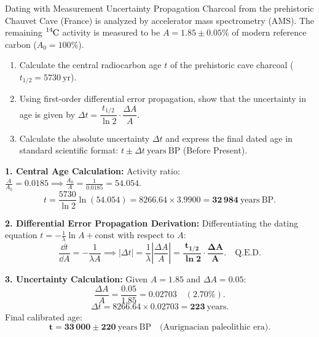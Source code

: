 \begin{exercise}{Dating with Measurement Uncertainty Propagation}
Charcoal from the prehistoric Chauvet Cave (France) is analyzed by accelerator mass spectrometry (AMS). The remaining $\ce{^{14}C}$ activity is measured to be $A = 1.85 \pm 0.05\%$ of modern reference carbon ($A_0 = 100\%$).
\begin{enumerate}[leftmargin=1.5em,itemsep=2pt]
  \item Calculate the central radiocarbon age $t$ of the prehistoric cave charcoal ($t_{1/2} = 5730\ \mathrm{yr}$).
  \item Using first-order differential error propagation, show that the uncertainty in age is given by $\Delta t = \dfrac{t_{1/2}}{\ln 2} \cdot \dfrac{\Delta A}{A}$.
  \item Calculate the absolute uncertainty $\Delta t$ and express the final dated age in standard scientific format: $t \pm \Delta t\ \mathrm{years\ BP}$ (Before Present).
\end{enumerate}
\end{exercise}

\begin{tabletworkspace}[5.0cm]
\end{tabletworkspace}

\begin{solution}
\textbf{1. Central Age Calculation:}
Activity ratio: $\frac{A}{A_0} = 0.0185 \implies \frac{A_0}{A} = \frac{1}{0.0185} = 54.054$.
\[
t = \frac{5730}{\ln 2} \ln(54.054) = 8266.64 \times 3.9900 = \mathbf{32\,984\ \mathrm{years\ BP}}.
\]

\textbf{2. Differential Error Propagation Derivation:}
Differentiating the dating equation $t = -\frac{1}{\lambda} \ln A + \text{const}$ with respect to $A$:
\[
\frac{\dd t}{\dd A} = -\frac{1}{\lambda A} \implies |\Delta t| = \frac{1}{\lambda} \left| \frac{\Delta A}{A} \right| = \mathbf{\frac{t_{1/2}}{\ln 2} \cdot \frac{\Delta A}{A}}. \quad \text{Q.E.D.}
\]

\textbf{3. Uncertainty Calculation:}
Given $A = 1.85$ and $\Delta A = 0.05$:
\[
\frac{\Delta A}{A} = \frac{0.05}{1.85} = 0.02703 \quad (2.70\%).
\]
\[
\Delta t = 8266.64 \times 0.02703 = \mathbf{223\ \mathrm{years}}.
\]
Final calibrated age:
\[
\mathbf{t = 33\,000 \pm 220\ \mathrm{years\ BP}} \quad \text{(Aurignacian paleolithic era)}.
\]
\end{solution}

